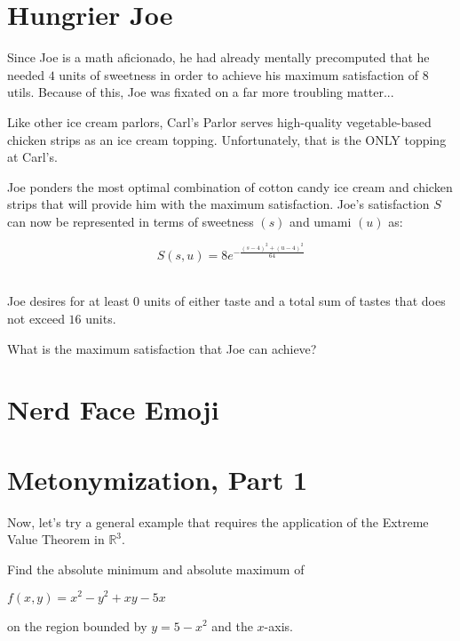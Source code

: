 \setcounter{chapter}{2}
\chapter{Hungrier Joe}
Since Joe is a math aficionado, he had already mentally precomputed that he needed $4$ units of sweetness in order to achieve his maximum satisfaction of $8$ utils.
Because of this, Joe was fixated on a far more troubling matter...

Like other ice cream parlors, Carl's Parlor serves high-quality vegetable-based chicken strips as an ice cream topping.
Unfortunately, that is the ONLY topping at Carl's.

Joe ponders the most optimal combination of cotton candy ice cream and chicken strips that will provide him with the maximum satisfaction.
Joe's satisfaction $S$ can now be represented in terms of sweetness $(s)$ and umami $(u)$ as:\par
\LARGE
\begin{equation}
	S(s, u) = 8e^{-\frac{(s-4)^2+(u-4)^2}{64}}
\end{equation}
\normalsize
\\
\begin{eg}
	Joe desires for at least $0$ units of either taste and a total sum of tastes that does not exceed $16$ units.

	What is the maximum satisfaction that Joe can achieve?
\end{eg}

\setcounter{chapter}{3}
\chapter{Nerd Face Emoji} %
\begin{theorem}
	
\end{theorem}
\setcounter{chapter}{4}
\chapter{Metonymization, Part 1}
Now, let's try a general example that requires the application of the Extreme Value Theorem in $\mathbb{R}^3$.
\begin{eg}
	Find the absolute minimum and absolute maximum of
	\begin{center}
		$f(x, y) = x^2 - y^2 + xy - 5x$
	\end{center}
	on the region bounded by $y = 5 - x^2$ and the $x$-axis.
\end{eg}
